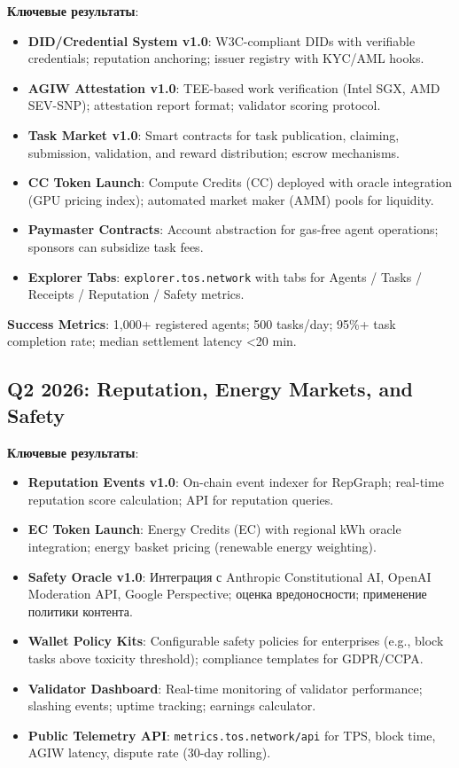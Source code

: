 \documentclass[11pt]{article}
\begin{document}
\textbf{Ключевые результаты}:
\begin{itemize}[noitemsep]
  \item \textbf{DID/Credential System v1.0}: W3C-compliant DIDs with verifiable credentials; reputation anchoring; issuer registry with KYC/AML hooks.
  \item \textbf{AGIW Attestation v1.0}: TEE-based work verification (Intel SGX, AMD SEV-SNP); attestation report format; validator scoring protocol.
  \item \textbf{Task Market v1.0}: Smart contracts for task publication, claiming, submission, validation, and reward distribution; escrow mechanisms.
  \item \textbf{CC Token Launch}: Compute Credits (CC) deployed with oracle integration (GPU pricing index); automated market maker (AMM) pools for liquidity.
  \item \textbf{Paymaster Contracts}: Account abstraction for gas-free agent operations; sponsors can subsidize task fees.
  \item \textbf{Explorer Tabs}: \texttt{explorer.tos.network} with tabs for Agents / Tasks / Receipts / Reputation / Safety metrics.
\end{itemize}

\textbf{Success Metrics}: 1,000+ registered agents; 500 tasks/day; 95\%+ task completion rate; median settlement latency <20 min.

\subsection{Q2 2026: Reputation, Energy Markets, and Safety}

\textbf{Ключевые результаты}:
\begin{itemize}[noitemsep]
  \item \textbf{Reputation Events v1.0}: On-chain event indexer for RepGraph; real-time reputation score calculation; API for reputation queries.
  \item \textbf{EC Token Launch}: Energy Credits (EC) with regional kWh oracle integration; energy basket pricing (renewable energy weighting).
  \item \textbf{Safety Oracle v1.0}: Интеграция с Anthropic Constitutional AI, OpenAI Moderation API, Google Perspective; оценка вредоносности; применение политики контента.
  \item \textbf{Wallet Policy Kits}: Configurable safety policies for enterprises (e.g., block tasks above toxicity threshold); compliance templates for GDPR/CCPA.
  \item \textbf{Validator Dashboard}: Real-time monitoring of validator performance; slashing events; uptime tracking; earnings calculator.
  \item \textbf{Public Telemetry API}: \texttt{metrics.tos.network/api} for TPS, block time, AGIW latency, dispute rate (30-day rolling).
\end{itemize}
\end{document}
